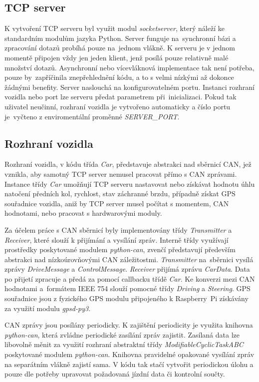 \documentclass[czech, bachelor]{diploma}
\begin{document}
\subsection{TCP server}
K vytvoření TCP serveru byl využit modul \emph{socketserver}, který náleží ke standardním modulům jazyka Python. Server funguje
na~synchronní bázi a zpracování dotazů probíhá pouze na~jednom vlákně. K serveru je v jednom momentě připojen vždy jen jeden
klient, jenž posílá pouze relativně malé množství dotazů. Asynchronní nebo vícevláknová implementace tak není potřeba, pouze
by~zapříčinila znepřehlednění kódu, a to s velmi nízkými až dokonce žádnými benefity. Server naslouchá na konfigurovatelném portu.
Instanci rozhraní vozidla nebo port lze serveru předat parametrem při~inicializaci. Pokud tak uživatel neučinní, rozhraní vozidla
je vytvořeno automaticky a číslo portu je~vyčteno z enviromentální proměnné \emph{SERVER\_PORT}.

\subsection{Rozhraní vozidla}
Rozhraní vozidla, v kódu třída \emph{Car}, představuje abstrakci nad sběrnicí CAN, jež vznikla, aby samotný TCP server nemusel
pracovat přímo s CAN zprávami. Instance třídy \emph{Car} umožňují TCP serveru nastavovat nebo získávat hodnotu úhlu natočení
předních kol, rychlost, stav záchranné brzdu, případně získat GPS souřadnice vozidla, aniž by TCP server musel počítat s momentem,
CAN hodnotami, nebo pracovat s hardwarovými moduly.

Za účelem práce s CAN sběrnicí byly implementovány třídy \emph{Transmitter} a \emph{Receiver}, které slouží k přijímání a vysílání
zpráv. Interně třídy využívají prostředky poskytované modulem \emph{python-can}, zvenčí představují především abstrakci
nad nízkoúrovňovými CAN záležitostmi. \emph{Transmitter} na~sběrnici vysílá zprávy \emph{DriveMessage} a \emph{ControlMessage}.
\emph{Receiver} přijímá zprávu \emph{CarData}. Data po přijetí zpracuje a předá za pomocí callbacku třídě \emph{Car}. Ke konverzi
mezi CAN hodnotami a~formátem IEEE 754 \cite{floating-point-source} slouží pomocné třídy \emph{Driving} a \emph{Steering}. GPS
souřadnice jsou z fyzického GPS modulu připojeného k Raspberry~Pi získávány za využití modulu \emph{gpsd-py3}.

CAN zprávy jsou posílány periodicky. K zajištění periodicity je využita knihovna \emph{python-can}, která zvládne periodické
zasílání zpráv zajistit. Zasílaná data lze libovolně měnit za využití rozhraní abstraktní třídy \emph{ModifiableCyclicTaskABC}
poskytované modulem \emph{python-can}. Knihovna pravidelné opakované vysílání zpráv na separátním vlákně zajistí sama. V kódu tak
stačí vytvořit periodickou úlohu a pouze dle potřeby upravovat požadovaná jízdní data či kontrolní součty.
\end{document}
